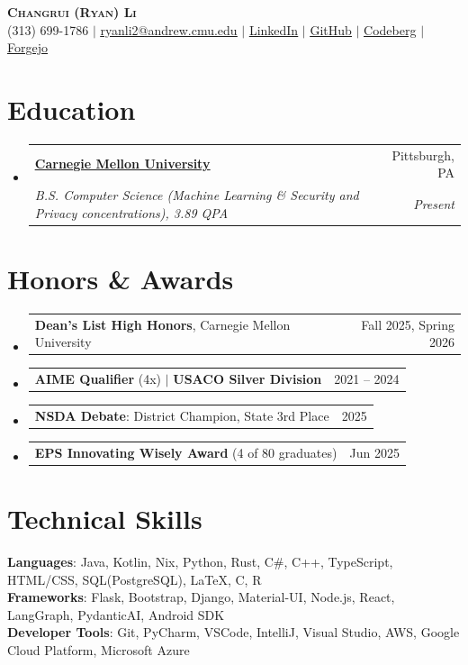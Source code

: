 \documentclass[letterpaper,11pt]{article}
\makeatletter
\newcommand{\resumeSubheading}[4]{
  \vspace{-2pt}\item
    \begin{tabular*}{0.97\textwidth}[t]{l@{\extracolsep{\fill}}r}
      \textbf{#1} & #2 \\
      \textit{\small#3} & \textit{\small #4} \\
    \end{tabular*}\vspace{-7pt}
}
\newcommand{\resumeAwardHeading}[2]{
    \item
    \begin{tabular*}{0.97\textwidth}{l@{\extracolsep{\fill}}r}
      \small#1 & #2 \\
    \end{tabular*}\vspace{-7pt}
}
\newcommand{\resumeSubHeadingListStart}{\begin{itemize}[leftmargin=0.15in, label={}]}
\newcommand{\resumeSubHeadingListEnd}{\end{itemize}}
\makeatother
\begin{document}
\begin{center}
    \textbf{\Huge \scshape Changrui (Ryan) Li} \\ \vspace{1pt}
    \small (313) 699-1786 $|$ \href{mailto:ryanli2@andrew.cmu.edu}{\underline{ryanli2@andrew.cmu.edu}} $|$ \href{https://www.linkedin.com/in/ryan-li-ab139919b/}{\underline{LinkedIn}} $|$
    \href{https://github.com/thesuperRL}{\underline{GitHub}} $|$
    \href{https://codeberg.org/thesuperRL}{\underline{Codeberg}} $|$
    \href{https://git.cmu.dev/thesuperRL}{\underline{Forgejo}}
\end{center}

\section{Education}
  \resumeSubHeadingListStart
      \resumeSubheading
              {\href{https://www.cmu.edu/}{\underline{Carnegie Mellon University}} }{Pittsburgh, PA}
              {B.S. Computer Science (Machine Learning \& Security and Privacy concentrations), 3.89 QPA}{Present}

  \resumeSubHeadingListEnd

\section{Honors \& Awards}
  \resumeSubHeadingListStart
    \resumeAwardHeading{\textbf{Dean's List High Honors}, Carnegie Mellon University}{Fall 2025, Spring 2026}
    \resumeAwardHeading{\textbf{AIME Qualifier} (4x) $|$ \textbf{USACO Silver Division}}{2021 -- 2024}
    \resumeAwardHeading{\textbf{NSDA Debate}: District Champion, State 3rd Place}{2025}
    \resumeAwardHeading{\textbf{EPS Innovating Wisely Award} (4 of 80 graduates)}{Jun 2025}
  \resumeSubHeadingListEnd

\section{Technical Skills}
 \begin{itemize}[leftmargin=0.15in, label={}]
    \small{\item{
     \textbf{Languages}{: Java, Kotlin, Nix, Python, Rust, C\#, C++, TypeScript, HTML/CSS, SQL(PostgreSQL), \LaTeX, C, R} \\
     \textbf{Frameworks}{: Flask, Bootstrap, Django, Material-UI, Node.js, React, LangGraph, PydanticAI, Android SDK} \\
     \textbf{Developer Tools}{: Git, PyCharm, VSCode, IntelliJ, Visual Studio, AWS, Google Cloud Platform, Microsoft Azure} \\
    }}
 \end{itemize}
\end{document}
